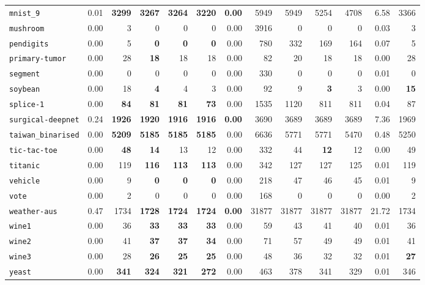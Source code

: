 \begin{tabular}{lrrrrrrrrrrrr}
\texttt{mnist\_9} & 0.01 & \textbf{3299} & \textbf{3267} & \textbf{3264} & \textbf{3220} & \textbf{0.00} & 5949 & 5949 & 5254 & 4708 & 6.58 & 3366\\
\texttt{mushroom} & 0.00 & 3 & 0 & 0 & 0 & 0.00 & 3916 & 0 & 0 & 0 & 0.03 & 3\\
\texttt{pendigits} & 0.00 & 5 & \textbf{0} & \textbf{0} & \textbf{0} & 0.00 & 780 & 332 & 169 & 164 & 0.07 & 5\\
\texttt{primary-tumor} & 0.00 & 28 & \textbf{18} & 18 & 18 & 0.00 & 82 & 20 & 18 & 18 & 0.00 & 28\\
\texttt{segment} & 0.00 & 0 & 0 & 0 & 0 & 0.00 & 330 & 0 & 0 & 0 & 0.01 & 0\\
\texttt{soybean} & 0.00 & 18 & \textbf{4} & 4 & 3 & 0.00 & 92 & 9 & \textbf{3} & 3 & 0.00 & \textbf{15}\\
\texttt{splice-1} & 0.00 & \textbf{84} & \textbf{81} & \textbf{81} & \textbf{73} & 0.00 & 1535 & 1120 & 811 & 811 & 0.04 & 87\\
\texttt{surgical-deepnet} & 0.24 & \textbf{1926} & \textbf{1920} & \textbf{1916} & \textbf{1916} & \textbf{0.00} & 3690 & 3689 & 3689 & 3689 & 7.36 & 1969\\
\texttt{taiwan\_binarised} & 0.00 & \textbf{5209} & \textbf{5185} & \textbf{5185} & \textbf{5185} & 0.00 & 6636 & 5771 & 5771 & 5470 & 0.48 & 5250\\
\texttt{tic-tac-toe} & 0.00 & \textbf{48} & \textbf{14} & 13 & 12 & 0.00 & 332 & 44 & \textbf{12} & 12 & 0.00 & 49\\
\texttt{titanic} & 0.00 & 119 & \textbf{116} & \textbf{113} & \textbf{113} & 0.00 & 342 & 127 & 127 & 125 & 0.01 & 119\\
\texttt{vehicle} & 0.00 & 9 & \textbf{0} & \textbf{0} & \textbf{0} & 0.00 & 218 & 47 & 46 & 45 & 0.01 & 9\\
\texttt{vote} & 0.00 & 2 & 0 & 0 & 0 & 0.00 & 168 & 0 & 0 & 0 & 0.00 & 2\\
\texttt{weather-aus} & 0.47 & 1734 & \textbf{1728} & \textbf{1724} & \textbf{1724} & \textbf{0.00} & 31877 & 31877 & 31877 & 31877 & 21.72 & 1734\\
\texttt{wine1} & 0.00 & 36 & \textbf{33} & \textbf{33} & \textbf{33} & 0.00 & 59 & 43 & 41 & 40 & 0.01 & 36\\
\texttt{wine2} & 0.00 & 41 & \textbf{37} & \textbf{37} & \textbf{34} & 0.00 & 71 & 57 & 49 & 49 & 0.01 & 41\\
\texttt{wine3} & 0.00 & 28 & \textbf{26} & \textbf{25} & \textbf{25} & 0.00 & 48 & 36 & 32 & 32 & 0.01 & \textbf{27}\\
\texttt{yeast} & 0.00 & \textbf{341} & \textbf{324} & \textbf{321} & \textbf{272} & 0.00 & 463 & 378 & 341 & 329 & 0.01 & 346\\
\bottomrule
\end{tabular}
